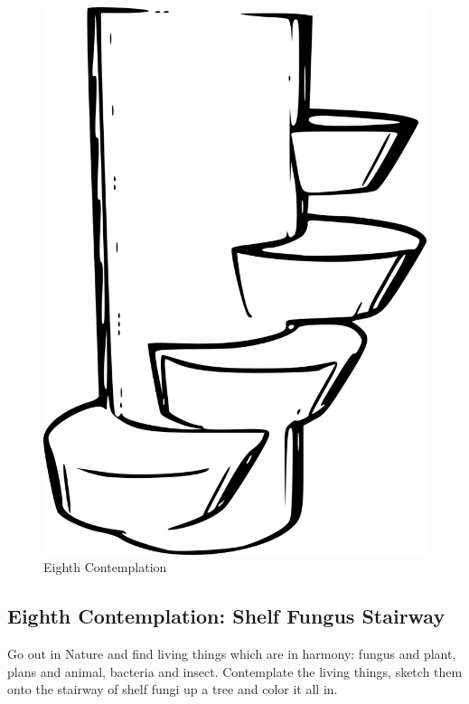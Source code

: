 \begin{figure}[htbp]
\centering
\includegraphics{images/contemplations/contemplation8C.png}
\caption{Eighth Contemplation}
\end{figure}

\subsection{Eighth Contemplation: Shelf Fungus
Stairway}\label{eighth-contemplation-shelf-fungus-stairway}

Go out in Nature and find living things which are in harmony: fungus and
plant, plans and animal, bacteria and insect. Contemplate the living
things, sketch them onto the stairway of shelf fungi up a tree and color
it all in.
